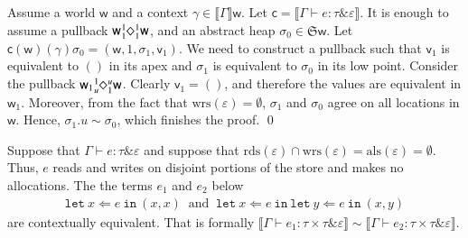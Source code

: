 \documentclass[orivec]{llncs}
\newcommand{\keywd}[1]{\mathtt{#1}}
\newcommand{\sq}[4]{\tensor*[^{#1}_{#2}]{\Diamond}{^{#3}_{#4}}}
\newcommand{\unitval}{\keywd{()}}
\newcommand{\letin}[2]{\keywd{let}\:{#1}\!\Leftarrow\!{#2}\:\keywd{in}\:}
\newcommand{\wrsin}[1]{\mathrm{wrs}({#1})}
\newcommand{\eff}{\varepsilon}
\newcommand{\reads}{\mathrm{rds}}
\newcommand{\writes}{\mathrm{wrs}}
\newcommand{\allocs}{\mathrm{als}}
\newcommand{\sem}[1]{\ensuremath{\llbracket {#1} \rrbracket}}
\renewenvironment{proof}{\vspace{-1mm} \noindent {\bf Proof}\quad}{\qed}
\newcommand\w{\ensuremath{\mathsf{w}}\xspace}
\newcommand{\Astores}{\mathfrak{S}}
\newcommand\val{\ensuremath{\mathsf{v}}\xspace}
\newcommand\cval{\ensuremath{\mathsf{c}}\xspace}
\newcommand{\ety}[2]{{#1}\mathrel{\&}{#2}}
\begin{document}
\begin{proof}
Assume a world \w and a context $\gamma \in \sem{\Gamma}\w$.
Let $\cval = \sem{\Gamma \vdash e : \ety{\tau}{\eff}}$. 
It is enough to assume a pullback 
$\w \sq{1}{1}{1}{1} \w$, and an abstract heap $\sigma_0 \in
\Astores \w$. Let $\cval(\w)(\gamma)\sigma_0  =  (\w, 1, \sigma_1,
\val_1)$. We need to construct a pullback such that $\val_1$ is equivalent
to $\unitval$ in its apex and $\sigma_1$ is equivalent to $\sigma_0$ in
its low point. Consider the pullback $\w_1 \sq{1}{u}{u}{1} \w$. Clearly
$\val_1 = \unitval$, and therefore the values are equivalent in $\w_1$.
Moreover, from the fact that $\wrsin{\eff} =
\emptyset$, $\sigma_1$ and $\sigma_0$ agree on all locations in $\w$.
Hence, $\sigma_1.u \sim \sigma_0$, which finishes the proof. 
\end{proof}


\begin{proposition}\label{dupl}
  Suppose that $\Gamma \vdash e:\ety{\tau}{\eff}$ and suppose
that
  $\reads(\eff)\cap\writes(\eff)=\allocs(\eff)=\emptyset$. Thus, $e$
  reads and writes on disjoint portions of the store and makes no
  allocations. The the terms  $e_1$ and $e_2$ below
\[\begin{array}{l}
\letin{x}{e}{(x,x)} ~\textrm{ and }~ \letin{x}{e} \letin{y}{e}{(x,y)}
\end{array}
\]
 are contextually equivalent. That is
formally $\sem{\Gamma \vdash e_1 : \ety{\tau \times \tau}{\eff}} \sim
\sem{\Gamma \vdash e_2 : \ety{\tau \times \tau}{\eff}}$.
\end{proposition}
\end{document}
